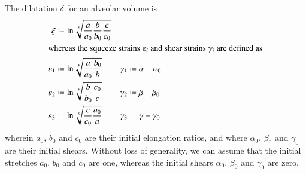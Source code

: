 The dilatation $\delta$ for an alveolar volume is
\begin{subequations}
    \begin{align}
    \mathrm  \xi & \defeq \ln \sqrt[3]{\frac{a}{a_0}
        \frac{b}{b_0} \frac{c}{c_0}} \\
    \intertext{whereas the squeeze strains $\varepsilon_i$ and shear strains $\gamma_i$ are defined as}
    \varepsilon_1 & \defeq \ln \sqrt[3]{\frac{a}
        {a_0} \frac{b_0}{b}} & 	\gamma_1 & \defeq \alpha - \alpha_0 \\
    \varepsilon_2 & \defeq \ln \sqrt[3]{\frac{b}
        {b_0} \frac{c_0}{c}} & \gamma_2 & \defeq \beta - \beta_0 \\
    \varepsilon_3 & \defeq \ln \sqrt[3]{\frac{c}
        {c_0} \frac{a_0}{a}} & 	\gamma_3 & \defeq \gamma - \gamma_0 
    \end{align}
\end{subequations}
wherein $a_0$, $b_0$ and $c_0$ are their initial elongation ratios, and where $\alpha_0$, $\beta_0$ and $\gamma_0$ are their initial shears. Without loss of generality, we can assume that the initial stretches $a_0$, $b_0$ and $c_0$ are one, whereas the initial shears $\alpha_0$, $\beta_0$ and $\gamma_0$ are zero.


